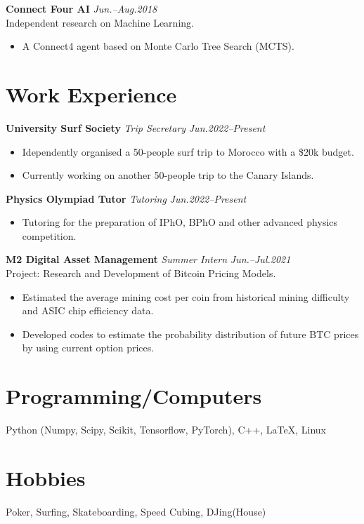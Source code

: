 \documentclass[11pt,a4paper,roman]{moderncv}        %
\begin{document}
\textbf{Connect Four AI} \hfill \textit{Jun.--Aug.2018} 
\vspace*{1mm}\\
{Independent research on Machine Learning.}
\vspace*{1mm}
\begin{itemize}
	\item A Connect4 agent based on Monte Carlo Tree Search (MCTS).
\end{itemize}

\section{Work Experience}

\textbf{University Surf Society} \textit{Trip Secretary} \hfill \textit{Jun.2022--Present}
\vspace*{1mm}
\begin{itemize}
	\item Idependently organised a 50-people surf trip to Morocco with a \$20k budget.
	\item Currently working on another 50-people trip to the Canary Islands.\\
\end{itemize}

\textbf{Physics Olympiad Tutor} \textit{Tutoring} \hfill \textit{Jun.2022--Present}
\vspace*{1mm}
\begin{itemize}
	\item Tutoring for the preparation of IPhO, BPhO and other advanced physics competition.\\
\end{itemize}

\textbf{M2 Digital Asset Management} \textit{Summer Intern} \hfill \textit{Jun.--Jul.2021}
\vspace*{1mm}\\
{Project: Research and Development of Bitcoin Pricing Models.}
\vspace*{1mm}
\begin{itemize}
	\item Estimated the average mining cost per coin from historical mining difficulty and ASIC chip efficiency data.
	\item Developed codes to estimate the probability distribution of future BTC prices by using current option prices.
\end{itemize}

\section{Programming/Computers}
{Python (Numpy, Scipy, Scikit, Tensorflow, PyTorch), C++, \LaTeX, Linux}

\section{Hobbies}
{Poker, Surfing, Skateboarding, Speed Cubing, DJing(House)}
\end{document}
